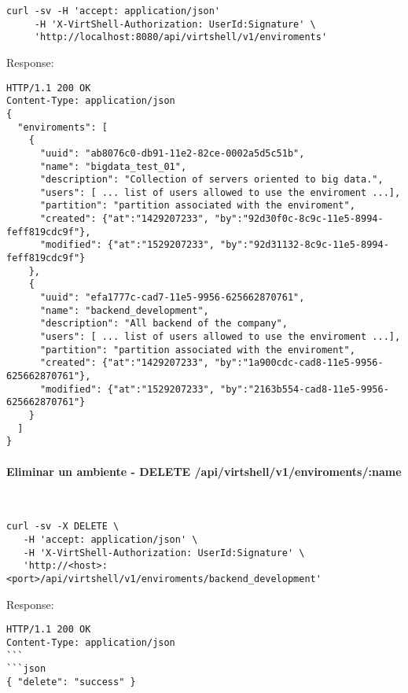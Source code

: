 \begin{lstlisting}[style=json]
curl -sv -H 'accept: application/json' 
     -H 'X-VirtShell-Authorization: UserId:Signature' \ 
     'http://localhost:8080/api/virtshell/v1/enviroments'
\end{lstlisting}

Response:

\begin{lstlisting}[style=json]
HTTP/1.1 200 OK
Content-Type: application/json
{
  "enviroments": [
    {
      "uuid": "ab8076c0-db91-11e2-82ce-0002a5d5c51b",
      "name": "bigdata_test_01",
      "description": "Collection of servers oriented to big data.", 
      "users": [ ... list of users allowed to use the enviroment ...],
      "partition": "partition associated with the enviroment",
      "created": {"at":"1429207233", "by":"92d30f0c-8c9c-11e5-8994-feff819cdc9f"},
      "modified": {"at":"1529207233", "by":"92d31132-8c9c-11e5-8994-feff819cdc9f"}
    },
    { 
      "uuid": "efa1777c-cad7-11e5-9956-625662870761",
      "name": "backend_development",
      "description": "All backend of the company", 
      "users": [ ... list of users allowed to use the enviroment ...],
      "partition": "partition associated with the enviroment",      
      "created": {"at":"1429207233", "by":"1a900cdc-cad8-11e5-9956-625662870761"},
      "modified": {"at":"1529207233", "by":"2163b554-cad8-11e5-9956-625662870761"}
    }    
  ]
}   
\end{lstlisting}

\paragraph{Eliminar un ambiente - DELETE /api/virtshell/v1/enviroments/:name} ~\\

\begin{lstlisting}[style=json]
curl -sv -X DELETE \
   -H 'accept: application/json' \
   -H 'X-VirtShell-Authorization: UserId:Signature' \
   'http://<host>:<port>/api/virtshell/v1/enviroments/backend_development'
\end{lstlisting}

Response:

\begin{lstlisting}[style=json]
HTTP/1.1 200 OK
Content-Type: application/json
```
```json
{ "delete": "success" }
\end{lstlisting}
